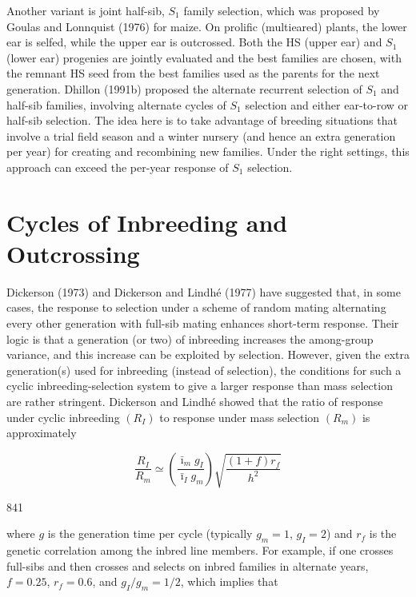 \documentclass{article}
\begin{document}
Another variant is joint half-sib,  $ S_1 $ family selection, which was proposed by Goulas and Lonnquist (1976) for maize. On prolific (multieared) plants, the lower ear is selfed, while the upper ear is outcrossed. Both the HS (upper ear) and  $ S_1 $ (lower ear) progenies are jointly evaluated and the best families are chosen, with the remnant HS seed from the best families used as the parents for the next generation. Dhillon (1991b) proposed the alternate recurrent selection of  $ S_1 $ and half-sib families, involving alternate cycles of  $ S_1 $ selection and either ear-to-row or half-sib selection. The idea here is to take advantage of breeding situations that involve a trial field season and a winter nursery (and hence an extra generation per year) for creating and recombining new families. Under the right settings, this approach can exceed the per-year response of  $ S_1 $ selection.

\section{Cycles of Inbreeding and Outcrossing}
Dickerson (1973) and Dickerson and Lindhé (1977) have suggested that, in some cases, the response to selection under a scheme of random mating alternating every other generation with full-sib mating enhances short-term response. Their logic is that a generation (or two) of inbreeding increases the among-group variance, and this increase can be exploited by selection. However, given the extra generation(s) used for inbreeding (instead of selection), the conditions for such a cyclic inbreeding-selection system to give a larger response than mass selection are rather stringent. Dickerson and Lindhé showed that the ratio of response under cyclic inbreeding  $ (R_I) $ to response under mass selection  $ (R_m) $ is approximately

\begin{equation}
\frac{R_{I}}{R_{m}}\simeq\left(\frac{\bar{\imath}_{m}g_{I}}{\bar{\imath}_{I}g_{m}}\right)\sqrt{\frac{(1+f)r_{f}}{h^{2}}}
\tag{23.19a}
\label{eq:23_19a}
\end{equation}

841

where $g$ is the generation time per cycle (typically $g_m = 1$, $g_I = 2$) and $r_f$ is the genetic correlation among the inbred line members. For example, if one crosses full-sibs and then crosses and selects on inbred families in alternate years, $f = 0.25$, $r_f = 0.6$, and $g_I/g_m = 1/2$, which implies that
\end{document}
